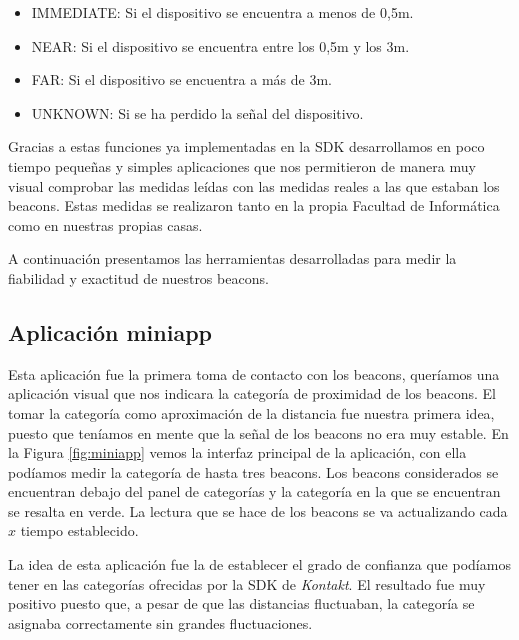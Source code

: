 \begin{itemize}
	\item IMMEDIATE: Si el dispositivo se encuentra a menos de 0,5m.
	\item NEAR: Si el dispositivo se encuentra entre los 0,5m y los 3m.
	\item FAR: Si el dispositivo se encuentra a más de 3m.
	\item UNKNOWN: Si se ha perdido la señal del dispositivo.
\end{itemize}

Gracias a estas funciones ya implementadas en la SDK desarrollamos en poco tiempo pequeñas y simples aplicaciones que nos permitieron de manera muy visual comprobar las medidas leídas con las medidas reales a las que estaban los beacons. Estas medidas se realizaron tanto en la propia Facultad de Informática como en nuestras propias casas.

A continuación presentamos las herramientas desarrolladas para medir la fiabilidad y exactitud de nuestros beacons.

\subsection{Aplicación miniapp}
Esta aplicación fue la primera toma de contacto con los beacons, queríamos una aplicación visual que nos indicara la categoría de proximidad de los beacons. El tomar la categoría como aproximación de la distancia fue nuestra primera idea, puesto que teníamos en mente que la señal de los beacons no era muy estable. En la Figura \ref{fig:miniapp} vemos la interfaz principal de la aplicación, con ella podíamos medir la categoría de hasta tres beacons. Los beacons considerados se encuentran debajo del panel de categorías y la categoría en la que se encuentran se resalta en verde. La lectura que se hace de los beacons se va actualizando cada $x$ tiempo establecido. 

La idea de esta aplicación fue la de establecer el grado de confianza que podíamos tener en las categorías ofrecidas por la SDK de \textit{Kontakt}. El resultado fue muy positivo puesto que, a pesar de que las distancias fluctuaban, la categoría se asignaba correctamente sin grandes fluctuaciones. 

